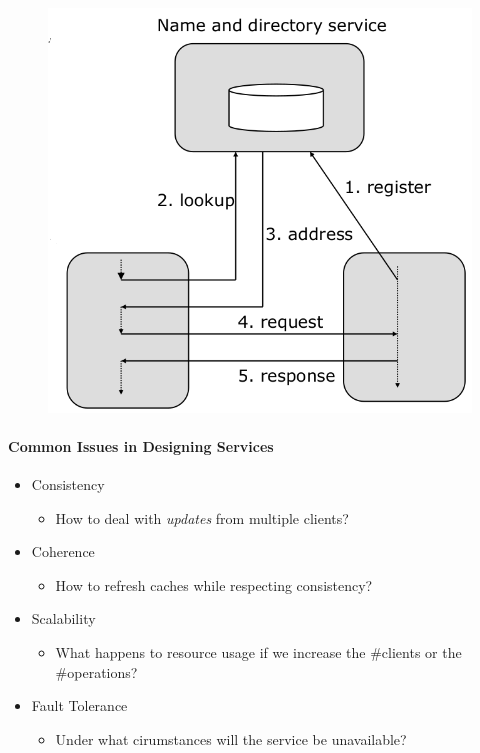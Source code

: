 \begin{figure}[h]
  \begin{minipage}{1.0\linewidth}
    \begin{center}
      \includegraphics[scale=0.15]{graphics/naming}
    \end{center}
  \end{minipage}
\end{figure}

\paragraph{Common Issues in Designing Services}
\begin{itemize}
\item Consistency
  \begin{itemize}
  \item How to deal with \textit{updates} from multiple clients?
  \end{itemize}
\item Coherence
  \begin{itemize}
  \item How to refresh caches while respecting consistency?
  \end{itemize}
\item Scalability
  \begin{itemize}
  \item What happens to resource usage if we increase the
    \#clients or the \#operations?
  \end{itemize}
\item Fault Tolerance
  \begin{itemize}
  \item Under what cirumstances will the service be unavailable?
  \end{itemize}
\end{itemize}

